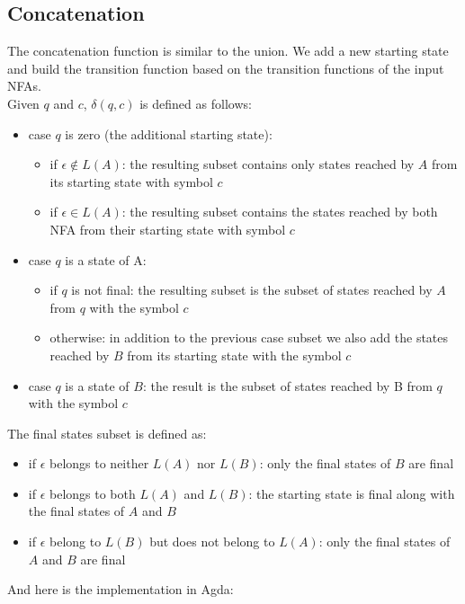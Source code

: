 \subsection{Concatenation}
The concatenation function is similar to the union. We add a new starting state and build the transition function based on the transition functions of the input NFAs.\\
Given $q$ and $c$, $\delta (q, c)$ is defined as follows:
\begin{itemize}
    \item case $q$ is zero (the additional starting state): 
        \begin{itemize}
            \item if $\epsilon \not \in L(A)$: the resulting subset contains only states reached by $A$ from its starting state with symbol $c$
            \item if $\epsilon \in L(A)$: the resulting subset contains the states reached by both NFA from their starting state with symbol $c$
        \end{itemize}
    \item case $q$ is a state of A: 
        \begin{itemize}
            \item if $q$ is not final: the resulting subset is the subset of states reached by $A$ from $q$ with the symbol $c$
            \item otherwise: in addition to the previous case subset we also add the states reached by $B$ from its starting state with the symbol $c$
        \end{itemize}
    \item case $q$ is a state of $B$: the result is the subset of states reached by B from $q$ with the symbol $c$
\end{itemize}
The final states subset is defined as:
\begin{itemize}
    \item if $\epsilon$ belongs to neither $L(A)$ nor $L(B)$: only the final states of $B$ are final
    \item if $\epsilon$ belongs to both $L(A)$ and $L(B)$: the starting state is final along with the final states of $A$ and $B$
    \item if $\epsilon$ belong to $L(B)$ but does not belong to $L(A)$: only the final states of $A$ and $B$ are final
\end{itemize}
And here is the implementation in Agda:
